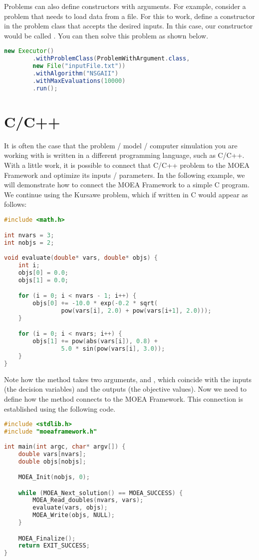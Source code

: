 Problems can also define constructors with arguments.  For example, consider a problem that needs to load data from a file.  For this to work, define a constructor in the problem class that accepts the desired inputs.  In this case, our constructor would be called .  You can then solve this problem as shown below.

\begin{lstlisting}[language=Java]
new Executor()
		.withProblemClass(ProblemWithArgument.class,
        new File("inputFile.txt"))
		.withAlgorithm("NSGAII")
		.withMaxEvaluations(10000)
		.run();
\end{lstlisting}

\section{C/C++}
It is often the case that the problem / model / computer simulation you are working with is written in a different programming language, such as C/C++.  With a little work, it is possible to connect that C/C++ problem to the MOEA Framework and optimize its inputs / parameters.  In the following example, we will demonstrate how to connect the MOEA Framework to a simple C program.  We continue using the Kursawe problem, which if written in C would appear as follows:

\begin{lstlisting}[language=C]
#include <math.h>

int nvars = 3;
int nobjs = 2;
 
void evaluate(double* vars, double* objs) {
	int i;
	objs[0] = 0.0;
	objs[1] = 0.0;

	for (i = 0; i < nvars - 1; i++) {
		objs[0] += -10.0 * exp(-0.2 * sqrt(
				pow(vars[i], 2.0) + pow(vars[i+1], 2.0)));
	}

	for (i = 0; i < nvars; i++) {
		objs[1] += pow(abs(vars[i]), 0.8) +  
				5.0 * sin(pow(vars[i], 3.0));
	}
}
\end{lstlisting}

Note how the  method takes two arguments,  and , which coincide with the inputs (the decision variables) and the outputs (the objective values).  Now we need to define how the  method connects to the MOEA Framework.  This connection is established using the following code.

\begin{lstlisting}[language=C]
#include <stdlib.h>
#include "moeaframework.h"
 
int main(int argc, char* argv[]) {
	double vars[nvars];
	double objs[nobjs];

	MOEA_Init(nobjs, 0);

	while (MOEA_Next_solution() == MOEA_SUCCESS) {
		MOEA_Read_doubles(nvars, vars);
		evaluate(vars, objs);
		MOEA_Write(objs, NULL);
	}

	MOEA_Finalize();
	return EXIT_SUCCESS;
}
\end{lstlisting}

